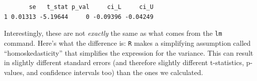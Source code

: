 \documentclass[
  letterpaper,
  DIV=11,
  numbers=noendperiod]{scrreprt}
\newenvironment{Shaded}{\begin{snugshade}}{\end{snugshade}}
\newcommand{\CommentTok}[1]{\textcolor[rgb]{0.37,0.37,0.37}{#1}}
\newcommand{\DecValTok}[1]{\textcolor[rgb]{0.68,0.00,0.00}{#1}}
\newcommand{\FloatTok}[1]{\textcolor[rgb]{0.68,0.00,0.00}{#1}}
\newcommand{\FunctionTok}[1]{\textcolor[rgb]{0.28,0.35,0.67}{#1}}
\newcommand{\NormalTok}[1]{\textcolor[rgb]{0.00,0.23,0.31}{#1}}
\newcommand{\OtherTok}[1]{\textcolor[rgb]{0.00,0.23,0.31}{#1}}
\newcommand{\SpecialCharTok}[1]{\textcolor[rgb]{0.37,0.37,0.37}{#1}}
\begin{document}
\begin{Shaded}
\end{Shaded}

\begin{verbatim}
       se   t_stat p_val     ci_L     ci_U
1 0.01313 -5.19644     0 -0.09396 -0.04249
\end{verbatim}

Interestingly, these are not \emph{exactly} the same as what comes from
the \texttt{lm} command. Here's what the difference is: \texttt{R} makes
a simplifying assumption called ``homoskedasticity'' that simplifies the
expression for the variance. This can result in slightly different
standard errors (and therefore slightly different t-statistics,
p-values, and confidence intervals too) than the ones we calculated.
\end{document}
